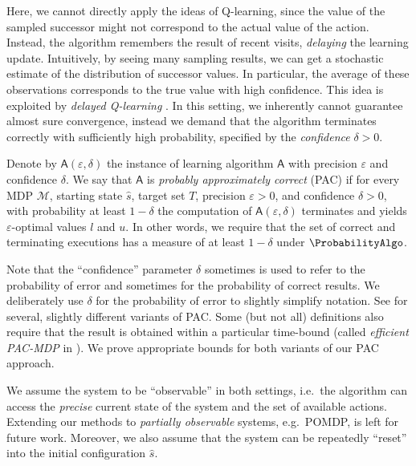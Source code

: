 \documentclass{theoretics}
\newcommand{\MDP}{\mathcal{M}}
\newcommand{\initialstate}{\hat{s}}
\newcommand{\learningalgo}{\mathsf{A}}
\begin{document}
Here, we cannot directly apply the ideas of Q-learning, since the value of the sampled successor might not correspond to the actual value of the action.
Instead, the algorithm remembers the result of recent visits, \emph{delaying} the learning update.
Intuitively, by seeing many sampling results, we can get a stochastic estimate of the distribution of successor values.
In particular, the average of these observations corresponds to the true value with high confidence.
This idea is exploited by \emph{delayed Q-learning} \cite{DBLP:conf/icml/StrehlLWLL06}.
In this setting, we inherently cannot guarantee almost sure convergence, instead we demand that the algorithm terminates correctly with sufficiently high probability, specified by the \emph{confidence} $\delta > 0$.
\begin{definition}
	Denote by $\learningalgo(\varepsilon, \delta)$ the instance of learning algorithm $\learningalgo$ with precision $\varepsilon$ and confidence $\delta$.
	We say that $\learningalgo$ is \emph{probably approximately correct} (PAC) if for every MDP $\MDP$, starting state $\initialstate$, target set $T$, precision $\varepsilon > 0$, and confidence $\delta > 0$, with probability at least $1 - \delta$ the computation of $\learningalgo(\varepsilon, \delta)$ terminates and yields $\varepsilon$-optimal values $l$ and $u$.
	In other words, we require that the set of correct and terminating executions has a measure of at least $1 - \delta$ under $\ProbabilityAlgo$.
\end{definition}
Note that the \enquote{confidence} parameter $\delta$ sometimes is used to refer to the probability of error and sometimes for the probability of correct results.
We deliberately use $\delta$ for the probability of error to slightly simplify notation.
See \cite{DBLP:journals/cacm/Valiant84,DBLP:conf/colt/Angluin88,DBLP:conf/icml/StrehlLWLL06,DBLP:conf/isaim/Strehl08} for several, slightly different variants of PAC.
Some (but not all) definitions also require that the result is obtained within a particular time-bound (called \emph{efficient PAC-MDP} in \cite{DBLP:conf/isaim/Strehl08}).
We prove appropriate bounds for both variants of our PAC approach.
\begin{remark}
	We assume the system to be \enquote{observable} in both settings, i.e.\ the algorithm can access the \emph{precise} current state of the system and the set of available actions.
	Extending our methods to \emph{partially observable} systems, e.g.\ POMDP, is left for future work.
	Moreover, we also assume that the system can be repeatedly \enquote{reset} into the initial configuration $\initialstate$.
\end{remark}
\end{document}
